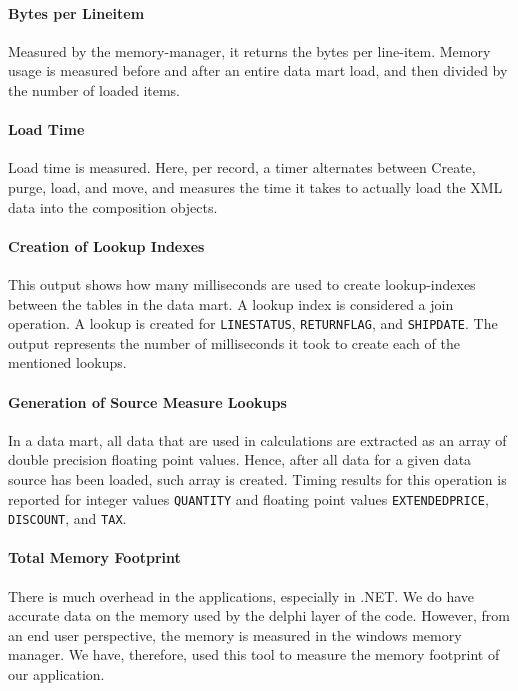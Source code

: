 \paragraph{Bytes per Lineitem}
\label{par:Bytes per Lineitem}
Measured by the memory-manager, it returns the bytes per line-item. Memory usage is measured before and after an entire data mart load, and then divided by the number of loaded items.

\paragraph{Load Time}
\label{par:Load Time}
Load time is measured. Here, per record, a timer alternates between Create, purge, load, and move, and measures the time it takes to actually load the XML data into the composition objects.

\paragraph{Creation of Lookup Indexes}
\label{par:Creation of Lookup Indexes}
This output shows how many milliseconds are used to create lookup-indexes between the tables in the data mart. A lookup index is considered a join operation. A lookup is created for \texttt{LINESTATUS}, \texttt{RETURNFLAG}, and \texttt{SHIPDATE}. The output represents the number of milliseconds it took to create each of the mentioned lookups.

\paragraph{Generation of Source Measure Lookups}
\label{par:Generation of Source Measure Lookups}
In a data mart, all data that are used in calculations are extracted as an array of double precision floating point values. Hence, after all data for a given data source has been loaded, such array is created. Timing results for this operation is reported for integer values \texttt{QUANTITY} and floating point values \texttt{EXTENDEDPRICE}, \texttt{DISCOUNT}, and \texttt{TAX}.

\paragraph{Total Memory Footprint}
\label{par:Total Memory Footprint}
There is much overhead in the applications, especially in .NET. We do have accurate data on the memory used by the delphi layer of the code. However, from an end user perspective, the memory is measured in the windows memory manager. We have, therefore, used this tool to measure the memory footprint of our application.



